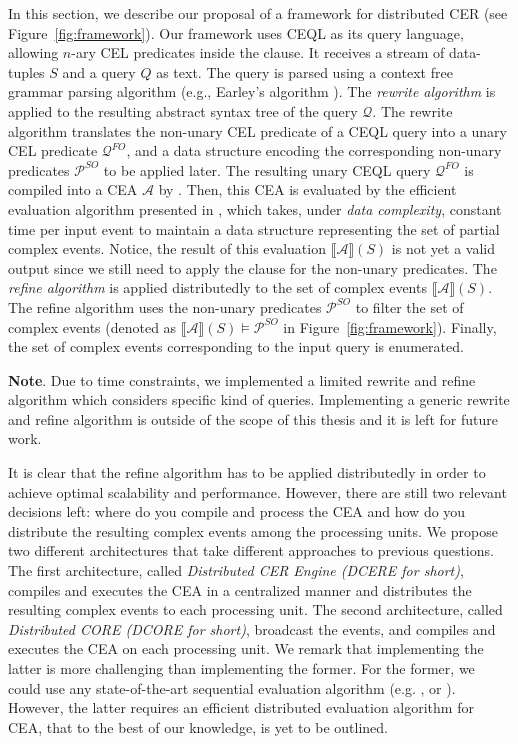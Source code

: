 In this section, we describe our proposal of a framework for distributed CER (see Figure~\ref{fig:framework}). Our framework uses CEQL as its query language, allowing $n$-ary CEL predicates inside the  clause. It receives a stream of data-tuples $S$ and a query $Q$ as text. The query is parsed using a context free grammar parsing algorithm (e.g., Earley's algorithm \cite{earley}). The \emph{rewrite algorithm} is applied to the resulting abstract syntax tree of the query $\mathcal{Q}$. The rewrite algorithm translates the non-unary CEL predicate of a CEQL query into a unary CEL predicate $\mathcal{Q}^{FO}$, and a data structure encoding the corresponding non-unary predicates $\mathcal{P}^{SO}$ to be applied later. The resulting unary CEQL query $\mathcal{Q}^{FO}$ is compiled into a CEA $\mathcal{A}$ by \cite[Theorem~6.2]{formal-framework-cer}. Then, this CEA is evaluated by the efficient evaluation algorithm presented in \cite{core}, which takes, under \emph{data complexity}, constant time per input event to maintain a data structure representing the set of partial complex events. Notice, the result of this evaluation ${\llbracket \mathcal{A} \rrbracket}(S)$ is not yet a valid output since we still need to apply the  clause for the non-unary predicates. The \emph{refine algorithm} is applied distributedly to the set of complex events ${\llbracket \mathcal{A} \rrbracket}(S)$. The refine algorithm uses the non-unary predicates $\mathcal{P}^{SO}$ to filter the set of complex events (denoted as ${\llbracket \mathcal{A} \rrbracket}(S) \models \mathcal{P}^{SO}$ in Figure~\ref{fig:framework}). Finally, the set of complex events corresponding to the input query is enumerated.

\textbf{Note}. Due to time constraints, we implemented a limited rewrite and refine algorithm which considers specific kind of queries. Implementing a generic rewrite and refine algorithm is outside of the scope of this thesis and it is left for future work.

It is clear that the refine algorithm has to be applied distributedly in order to achieve optimal scalability and performance.
However, there are still two relevant decisions left: where do you compile and process the CEA and how do you distribute the resulting complex events among the processing units. We propose two different architectures that take different approaches to previous questions. The first architecture, called \emph{Distributed CER Engine (DCERE for short)}, compiles and executes the CEA in a centralized manner and distributes the resulting complex events to each processing unit. The second architecture, called \emph{Distributed CORE (DCORE for short)}, broadcast the events, and compiles and executes the CEA on each processing unit. We remark that implementing the latter is more challenging than implementing the former. For the former, we could use any state-of-the-art sequential evaluation algorithm (e.g. \cite{formal-framework-cer}, or \cite{core}). However, the latter requires an efficient distributed evaluation algorithm for CEA, that to the best of our knowledge, is yet to be outlined.


